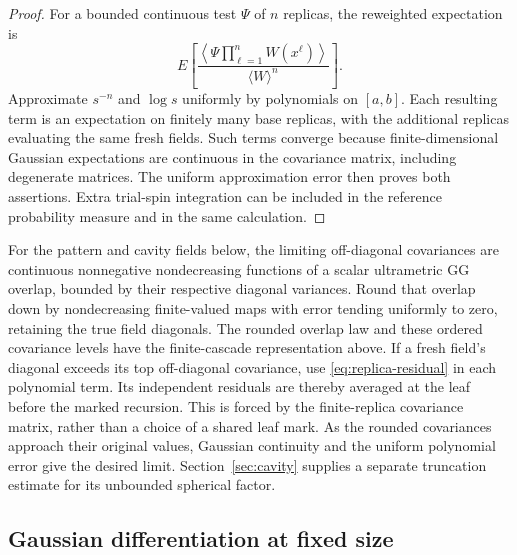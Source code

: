 \documentclass[11pt]{article}
\begin{document}
\begin{proof}
For a bounded continuous test $\Psi$ of $n$ replicas, the reweighted
expectation is
\begin{equation}\label{eq:bounded-replica-quotient}
 E\left[
 \frac{\left\langle\Psi\prod_{\ell=1}^nW(x^\ell)\right\rangle}
      {\langle W\rangle^n}\right].
\end{equation}
Approximate $s^{-n}$ and $\log s$ uniformly by polynomials on $[a,b]$.
Each resulting term is an expectation on finitely many base replicas,
with the additional replicas evaluating the same fresh fields. Such
terms converge because finite-dimensional Gaussian expectations are
continuous in the covariance matrix, including degenerate matrices.
The uniform approximation error then proves both assertions. Extra
trial-spin integration can be included in the reference probability
measure and in the same calculation.
\end{proof}

For the pattern and cavity fields below, the limiting off-diagonal
covariances are continuous nonnegative nondecreasing functions of a
scalar ultrametric GG overlap, bounded by their respective diagonal
variances. Round that overlap down by nondecreasing finite-valued maps with
error tending uniformly to zero, retaining the true field diagonals.
The rounded overlap law and these ordered covariance levels have the
finite-cascade representation above. If a fresh
field's diagonal exceeds its top off-diagonal covariance, use
\eqref{eq:replica-residual} in each polynomial term. Its independent
residuals are thereby averaged at the leaf before the marked recursion.
This is forced by the finite-replica covariance matrix, rather than a
choice of a shared leaf mark. As the rounded covariances approach their
original values, Gaussian continuity and the uniform polynomial error
give the desired limit. Section~\ref{sec:cavity} supplies a separate
truncation estimate for its unbounded spherical factor.

\subsection{Gaussian differentiation at fixed size}\label{sec:gaussian-calculus}
\end{document}
